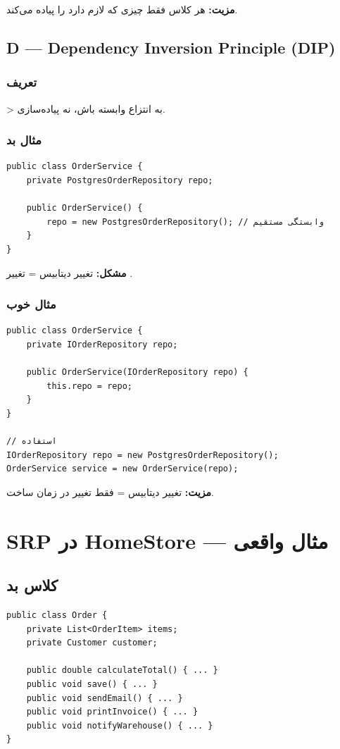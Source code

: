 \documentclass[12pt, a4paper]{article}
\begin{document}
\textbf{مزیت:} هر کلاس فقط چیزی که لازم دارد را پیاده می‌کند.

\subsection{D — Dependency Inversion Principle (DIP)}

\subsubsection{تعریف}
> به انتزاع وابسته باش، نه پیاده‌سازی.

\subsubsection{مثال بد}
\begin{lstlisting}
public class OrderService {
    private PostgresOrderRepository repo;
    
    public OrderService() {
        repo = new PostgresOrderRepository(); // وابستگی مستقیم
    }
}
\end{lstlisting}

\textbf{مشکل:} تغییر دیتابیس = تغییر .

\subsubsection{مثال خوب}
\begin{lstlisting}
public class OrderService {
    private IOrderRepository repo;
    
    public OrderService(IOrderRepository repo) {
        this.repo = repo;
    }
}

// استفاده
IOrderRepository repo = new PostgresOrderRepository();
OrderService service = new OrderService(repo);
\end{lstlisting}

\textbf{مزیت:} تغییر دیتابیس = فقط تغییر  در زمان ساخت.

\section{SRP در HomeStore — مثال واقعی}

\subsection{کلاس بد}

\begin{lstlisting}
public class Order {
    private List<OrderItem> items;
    private Customer customer;
    
    public double calculateTotal() { ... }
    public void save() { ... }
    public void sendEmail() { ... }
    public void printInvoice() { ... }
    public void notifyWarehouse() { ... }
}
\end{lstlisting}
\end{document}
